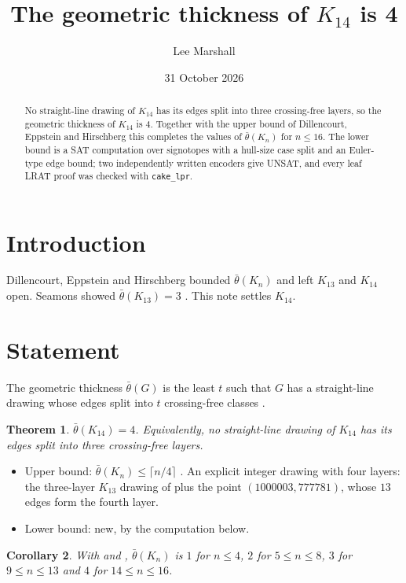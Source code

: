 \documentclass[11pt]{article}
\title{The geometric thickness of $K_{14}$ is 4}
\author{Lee Marshall}
\date{31 October 2026}
\newtheorem{theorem}{Theorem}
\newtheorem{corollary}[theorem]{Corollary}
\begin{document}
\maketitle

\begin{abstract}
No straight-line drawing of $K_{14}$ has its edges split into three crossing-free layers, so the geometric
thickness of $K_{14}$ is $4$. Together with the upper bound of Dillencourt, Eppstein and Hirschberg this completes
the values of $\bar\theta(K_n)$ for $n\le 16$. The lower bound is a SAT computation over signotopes with a
hull-size case split and an Euler-type edge bound; two independently written encoders give UNSAT, and every leaf
LRAT proof was checked with \texttt{cake\_lpr}.
\end{abstract}

\section{Introduction}
Dillencourt, Eppstein and Hirschberg \cite{DEH} bounded $\bar\theta(K_n)$ and left $K_{13}$ and $K_{14}$ open.
Seamons showed $\bar\theta(K_{13})=3$ \cite{Seamons}. This note settles $K_{14}$.

\section{Statement}
The geometric thickness $\bar\theta(G)$ is the least $t$ such that $G$ has a straight-line drawing whose edges split
into $t$ crossing-free classes \cite{DEH}.

\begin{theorem}\label{thm:main}
$\bar\theta(K_{14})=4$. Equivalently, no straight-line drawing of $K_{14}$ has its edges split into three
crossing-free layers.
\end{theorem}
\begin{itemize}
\item Upper bound: $\bar\theta(K_n)\le\lceil n/4\rceil$ \cite[Thm.~2.1]{DEH}. An explicit integer drawing with four
  layers: the three-layer $K_{13}$ drawing of \cite{Seamons} plus the point $(1000003,777781)$, whose $13$ edges form
  the fourth layer.
\item Lower bound: new, by the computation below.
\end{itemize}

\begin{corollary}
With \cite{DEH} and \cite{Seamons}, $\bar\theta(K_n)$ is $1$ for $n\le 4$, $2$ for $5\le n\le 8$, $3$ for
$9\le n\le 13$ and $4$ for $14\le n\le 16$.
\end{corollary}
\end{document}

